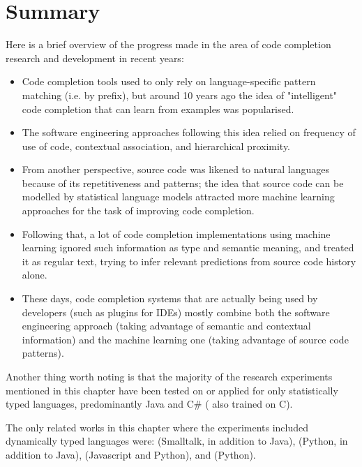 \section{Summary}
\label{sec:RelatedWorks-Summary}
Here is a brief overview of the progress made in the area of code completion research and development in recent years:

\begin{itemize}
    \item Code completion tools used to only rely on language-specific pattern matching (i.e. by prefix), but around 10 years ago the idea of "intelligent" code completion that can learn from examples was popularised.
    \item The software engineering approaches following this idea relied on frequency of use of code, contextual association, and hierarchical proximity.
    \item From another perspective, source code was likened to natural languages because of its repetitiveness and patterns; the idea that source code can be modelled by statistical language models attracted more machine learning approaches for the task of improving code completion.
    \item Following that, a lot of code completion implementations using machine learning ignored such information as type and semantic meaning, and treated it as regular text, trying to infer relevant predictions from source code history alone.
    \item These days, code completion systems that are actually being used by developers (such as plugins for IDEs) mostly combine both the software engineering approach (taking advantage of semantic and contextual information) and the machine learning one (taking advantage of source code patterns).
\end{itemize}

Another thing worth noting is that the majority of the research experiments mentioned in this chapter have been tested on or applied for only statistically typed languages, predominantly Java and C\# (\cite{Hind12a} also trained on C).

The only related works in this chapter where the experiments included dynamically typed languages were: \cite{Robb08a} (Smalltalk, in addition to Java), \cite{Tu14a} (Python, in addition to Java), \cite{Li17a} (Javascript and Python), and \cite{Svya19a} (Python).